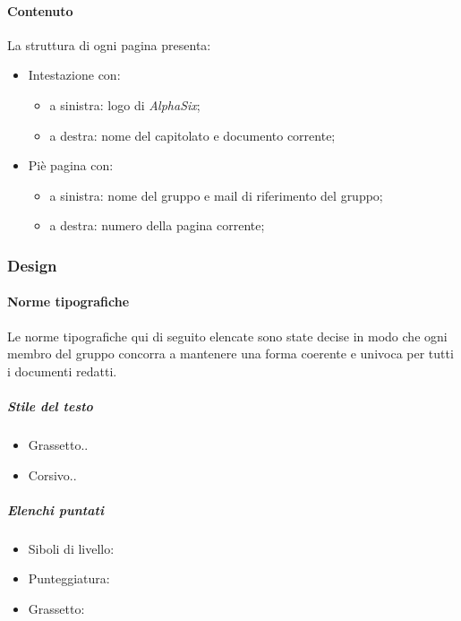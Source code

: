 			\paragraph{Contenuto}\label{PS:Documentazione:Struttura:Contenuto}
			La struttura di ogni pagina presenta:
			\begin{itemize}
				\item Intestazione con:
				\begin{itemize}
					\item a sinistra: logo di \textit{AlphaSix};
					\item a destra: nome del capitolato e documento corrente;
				\end{itemize}
				 \item Piè pagina con:
				 \begin{itemize}
				 	\item a sinistra: nome del gruppo e mail di riferimento del gruppo;
				 	\item a destra: numero della pagina corrente;
				\end{itemize}
			\end{itemize}


		\subsubsection{Design}\label{PS:Documentazione:Design}

			\paragraph{Norme tipografiche}\label{PS:Documentazione:Design:NormeT}
			Le norme tipografiche qui di seguito elencate sono state decise in modo che ogni membro del gruppo concorra a mantenere una forma coerente e univoca per tutti i documenti redatti.

			\subparagraph{Stile del testo}\label{PS:Documentazione:Design:NormeT:StileTesto}
			\begin{itemize}
				\item Grassetto..
				\item Corsivo..
			\end{itemize}

			\subparagraph{Elenchi puntati}\label{PS:Documentazione:Design:NormeT:ElenchiPuntati}
			\begin{itemize}
				\item Siboli di livello:
				\item Punteggiatura:
				\item Grassetto:
			\end{itemize}

